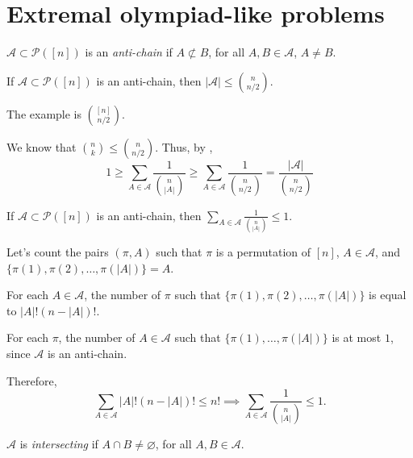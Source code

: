 \newpage\section{Extremal olympiad-like problems}

\begin{defn}
	$\mathcal{A} \subset \mathcal{P}([n])$ is an \emph{anti-chain} if  $A \not\subset B$, for all $A, B \in \mathcal{A}$, $A \neq B$.
\end{defn}

\begin{thm}[Sperner, 1910's] \label{thm:sperner}
	If $\mathcal A \subset \mathcal P([n])$ is an anti-chain, then $|\mathcal A| \le \binom{n}{n/2}$.
\end{thm}

The example is $\binom{[n]}{n/2}$.

\begin{dem}
	We know that $\binom{n}{k} \le \binom{n}{n/2}$. Thus, by , \[
		1 \ge \sum_{A\in \mathcal{A}} \frac{1}{\binom{n}{|A|}} \ge \sum_{A\in \mathcal{A}} \frac{1}{\binom{n}{n/2}} = \frac{|\mathcal{A}|}{\binom{n}{n/2}}
	\]
\end{dem}

\begin{lem}[LYMB, 1960's]\label{lem:lymb}
	If $\mathcal A \subset \mathcal P([n])$ is an anti-chain, then $\sum_{A \in \mathcal A} \frac{1}{\binom{n}{|A|}} \leq 1$.
\end{lem}

\begin{dem}
	Let's count the pairs $(\pi, A)$ such that $\pi$ is a permutation of $[n]$, $A \in \mathcal{A}$, and  $\{\pi(1), \pi(2), \dots, \pi(|A|)\} = A$.

	For each $A \in \mathcal{A}$, the number of $\pi$ such that $\{\pi(1), \pi(2), \dots, \pi(|A|)\}$ is equal to $|A|!(n - |A|)!$.

	For each $\pi$, the number of $A \in \mathcal{A}$ such that $\{\pi(1), \dots, \pi(|A|)\}$ is at most $1$, since $\mathcal{A}$ is an anti-chain.

	Therefore, \[
		\sum_{A \in \mathcal{A}} |A|!(n-|A|)! \le n!
		\implies
		\sum_{A \in \mathcal{A}} \frac{1}{\binom{n}{|A|}} \le 1.
	\]
\end{dem}

\begin{defn}
	$\mathcal{A}$ is \emph{intersecting} if $A \cap B \neq \varnothing$, for all  $A, B \in \mathcal{A}$.
\end{defn}


